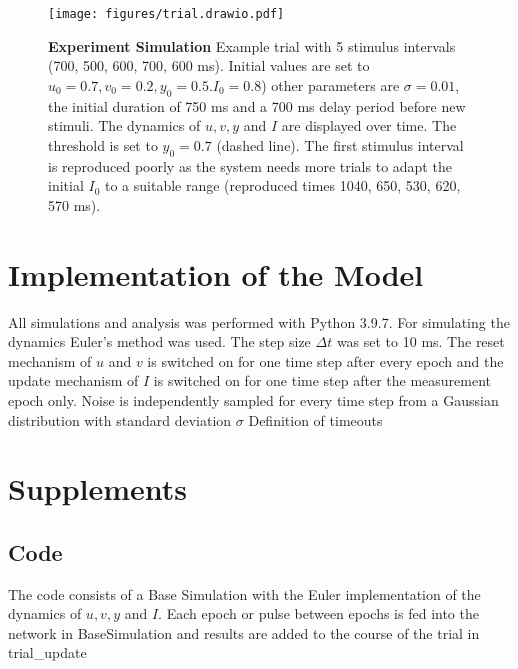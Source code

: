 \documentclass[9pt]{article}
\begin{document}
\begin{figure}[h]
	\centering
	\texttt{[image: figures/trial.drawio.pdf]}
	\caption{\textbf{Experiment Simulation} Example trial with 5 stimulus intervals (700, 500, 600, 700, 600 ms). Initial values are set to $u_0=0.7 , v_0=0.2 , y_0=0.5. I_0=0.8$) other parameters are $\sigma=0.01$, the initial duration of 750 ms and a 700 ms delay period before new stimuli. The dynamics of $u, v, y $ and $I$ are displayed over time. The threshold is set to $y_0=0.7$ (dashed line). The first stimulus interval is reproduced poorly as the system needs more trials to adapt the initial $I_0$ to a suitable range (reproduced times 1040, 650, 530, 620, 570 ms).}
\label{fig:trial}
\end{figure}


\section{Implementation of the Model}
All simulations and analysis was performed with Python 3.9.7. 
For simulating the dynamics Euler's method was used. The step size $\Delta t$ was set to 10 ms.
The reset mechanism of $u$ and $v$ is switched on for one time step after every epoch and the update mechanism of $I$ is switched on for one time step after the measurement epoch only. 
Noise is independently sampled for every time step from a Gaussian distribution with standard deviation $\sigma$
Definition of timeouts


\section{Supplements}

\subsection{Code}
The code consists of a Base Simulation with the Euler implementation of the dynamics of $u, v, y$ and $I$. Each epoch or pulse between epochs is fed into the network in BaseSimulation and results are added to the course of the trial in trial_update

\begin{figure}[h]
\label{fig:code}
\end{figure}

\printbibliography
\end{document}
